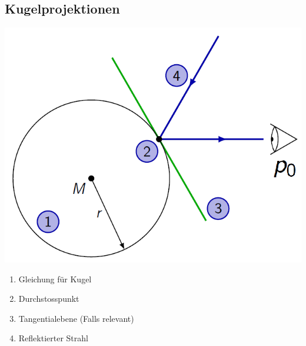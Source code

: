 \subsection{Kugelprojektionen}
	\begin{minipage}{0.4\textwidth}
		\includegraphics[width=\textwidth]{pics/Kugelprojektion.png}
	\end{minipage}
	\begin{minipage}{0.6\textwidth}
		\begin{enumerate}
			\item Gleichung für Kugel
			\item Durchstosspunkt
			\item Tangentialebene (Falls relevant)
			\item Reflektierter Strahl
		\end{enumerate}
	\end{minipage}\\
